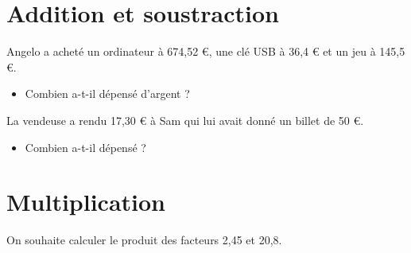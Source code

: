 \documentclass[../main.tex]{subfiles}
\begin{document}
    \part{Addition et soustraction}

    \begin{exemple}\par
        Angelo a acheté un ordinateur à 674,52 \euro, une clé USB à
        36,4 {\euro} et un jeu à 145,5 \euro.
        \begin{itemize}
            \item Combien a-t-il dépensé d'argent ?
        \end{itemize}
    \end{exemple}

    \begin{exemple}
        La vendeuse a rendu 17,30 {\euro} à Sam qui lui avait donné un billet
        de 50 \euro.
        \begin{itemize}
            \item Combien a-t-il dépensé ?
        \end{itemize}
    \end{exemple}

    \part{Multiplication}

        \begin{exemple}
            On souhaite calculer le produit des facteurs 2,45
            et 20,8.
        \end{exemple}
    
\end{document}

